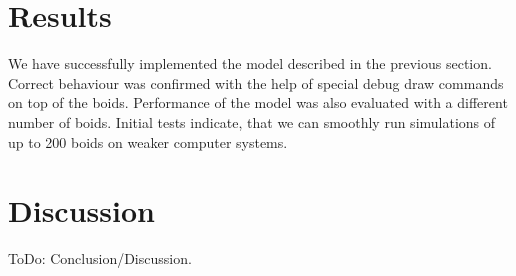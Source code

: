 \documentclass[9pt]{pnas-new}
\begin{document}
\section*{Results}
We have successfully implemented the model described in the previous section. Correct behaviour was confirmed
with the help of special debug draw commands on top of the boids. Performance of the model was also evaluated with a 
different number of boids. Initial tests indicate, that we can smoothly run simulations of up to 200 boids on weaker computer systems.
\section*{Discussion}
ToDo: Conclusion/Discussion.
\showacknow %


\begin{multicols}{2}
	\section*{\bibname}
	
\end{multicols}
\end{document}
